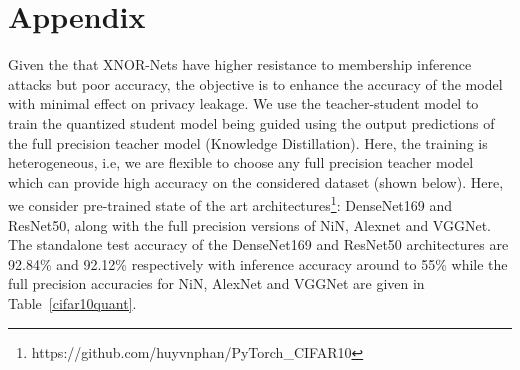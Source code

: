 \section{Appendix}

Given the that XNOR-Nets have higher resistance to membership inference attacks but poor accuracy, the objective is to enhance the accuracy of the model with minimal effect on privacy leakage.
We use the teacher-student model to train the quantized student model being guided using the output predictions of the full precision teacher model (Knowledge Distillation).
Here, the training is heterogeneous, i.e, we are flexible to choose any full precision teacher model which can provide high accuracy on the considered dataset (shown below).
Here, we consider pre-trained state of the art architectures\footnote{https://github.com/huyvnphan/PyTorch\_CIFAR10}: DenseNet169 and ResNet50, along with the full precision versions of NiN, Alexnet and VGGNet.
The standalone test accuracy of the DenseNet169 and ResNet50 architectures are 92.84\% and 92.12\% respectively with inference accuracy around to 55\% while the full precision accuracies for NiN, AlexNet and VGGNet are given in Table~\ref{cifar10quant}.


